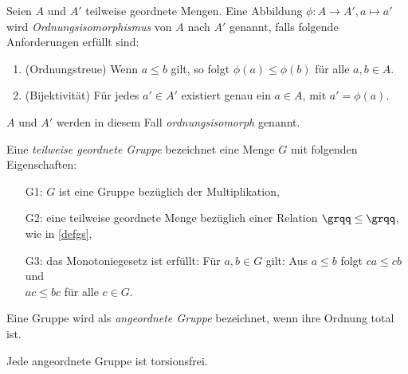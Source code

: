\begin{defn}\label{ordnungsisomorph}
Seien $A$ und $A'$ teilweise geordnete Mengen. Eine Abbildung $\phi \colon A \rightarrow A', a \mapsto a'$ wird \textit{Ordnungsisomorphismus} von $A$ nach $A'$ genannt, falls folgende Anforderungen erfüllt sind:
\begin{enumerate}
\item (Ordnungstreue) Wenn $a \leq b$ gilt, so folgt $\phi(a) \leq \phi(b)$ für alle $a, b  \in A$.
\item (Bijektivität) Für jedes $a' \in A'$ existiert genau ein $a \in A$, mit $a' = \phi(a)$.
\end{enumerate}
$A$ und $A'$ werden in diesem Fall \textit{ordnungsisomorph} genannt.
\end{defn}
%
\begin{defn}\label{twgG} %
Eine \textit{teilweise geordnete Gruppe} bezeichnet eine Menge $G$ mit folgenden Eigenschaften: 
%
\begin{enumerate}
\item[G1:] $G$ ist eine Gruppe bezüglich der Multiplikation,
\item[G2:] eine teilweise geordnete Menge bezüglich einer Relation $ \grqq\leq\grqq $, wie in \ref{defgs}, 
\item[G3:] das Monotoniegesetz ist erfüllt: Für $a, b \in  G$ gilt: Aus $a \leq b$ folgt $ca \leq  cb$ und \\ $ac \leq bc$ für alle $c \in G$.
\end{enumerate}
% 
\end{defn}
%
%
\begin{defn}\label{agG}
Eine Gruppe wird als \textit{angeordnete Gruppe} bezeichnet, wenn ihre Ordnung total ist.
\end{defn}
%
\begin{satz} \label{angeordnetFolgtTorsionsfrei} %
Jede angeordnete Gruppe ist torsionsfrei. 
\end{satz}
%
